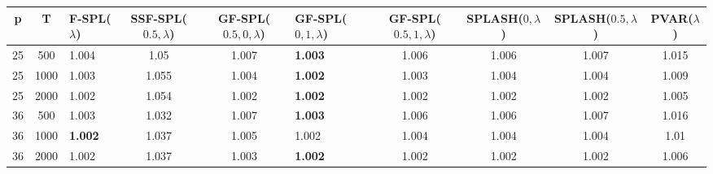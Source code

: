 \begin{tabular}{cclcclcccc}
\hline
  p  &  T   & F-SPL($\lambda$)   &  SSF-SPL($0.5, \lambda$)  &  GF-SPL($0.5, 0, \lambda$)  & GF-SPL($0, 1, \lambda$)   &  GF-SPL($0.5, 1, \lambda$)  &  SPLASH($0, \lambda$)  &  SPLASH($0.5, \lambda$)  &  PVAR($\lambda$)  \\
\hline
 25  & 500  & 1.004              &           1.05            &            1.007            & \textbf{1.003}            &            1.006            &         1.006          &          1.007           &       1.015       \\
 25  & 1000 & 1.003              &           1.055           &            1.004            & \textbf{1.002}            &            1.003            &         1.004          &          1.004           &       1.009       \\
 25  & 2000 & 1.002              &           1.054           &            1.002            & \textbf{1.002}            &            1.002            &         1.002          &          1.002           &       1.005       \\
 36  & 500  & 1.003              &           1.032           &            1.007            & \textbf{1.003}            &            1.006            &         1.006          &          1.007           &       1.016       \\
 36  & 1000 & \textbf{1.002}     &           1.037           &            1.005            & 1.002                     &            1.004            &         1.004          &          1.004           &       1.01        \\
 36  & 2000 & 1.002              &           1.037           &            1.003            & \textbf{1.002}            &            1.002            &         1.002          &          1.002           &       1.006       \\
\hline
\end{tabular}